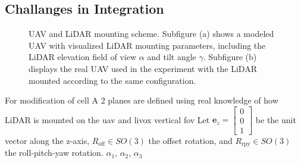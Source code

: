         \subsection{Challanges in Integration}
            \begin{figure}[htbp]
                \centering
                \caption{
                    UAV and LiDAR mounting scheme.
                    Subfigure (a) shows a modeled UAV with visualized LiDAR mounting parameters, including the LiDAR elevation field of view $\alpha$ and tilt angle $\gamma$. 
                    Subfigure (b) displays the real UAV used in the experiment with the LiDAR mounted according to the same configuration.                                                
                }
                \label{fig:uavs}
            \end{figure}

            For modification of cell A 2 planes are defined using real knowledge of how LiDAR is mounted on the uav and livox vertical fov
            Let $\mathbf{e}_z = \begin{bmatrix} 0 \\ 0 \\ 1 \end{bmatrix}$ be the unit vector along the z-axis,  
            $R_{\text{off}} \in SO(3)$ the offset rotation, and  
            $R_{\text{rpy}} \in SO(3)$ the roll-pitch-yaw rotation. 
            $\alpha_1$, $\alpha_2$, $\alpha_3$

